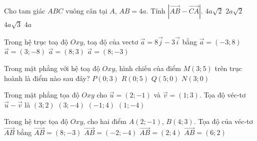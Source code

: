 \begin{ex}%
	Cho tam giác $ABC$ vuông cân tại $A$, $AB=4a$. Tính $|\overrightarrow{AB}-\overrightarrow{CA}|$.
	\choice
	{\True $ 4a\sqrt{2}$}
	{$2a\sqrt{2} $}
	{$ 4a\sqrt{3}$}
	{$ 4a$}
\end{ex}

\begin{ex}%
	Trong hệ trục toạ độ $Oxy$, toạ độ của vectơ $\overrightarrow{a}=8\overrightarrow{j}-3\overrightarrow{i}$ bằng
	\choice 
	{\True $\overrightarrow{a}=\left( -3;8 \right)$}
	{$\overrightarrow{a}=\left( 3;-8 \right)$}
	{$\overrightarrow{a}=\left( 8;3 \right)$}
	{$\overrightarrow{a}=\left( 8;-3 \right)$}
\end{ex}

\begin{ex}%
	Trong mặt phẳng với hệ toạ độ $Oxy$, hình chiếu của điểm $M(3;5)$ trên trục 
	hoành là điểm nào sau đây?
	\choice
	{$P(0;3)$}
	{$R(0;5)$}
	{$Q(5;0)$}
	{\True $N(3;0)$}
\end{ex}

\begin{ex}%
	Trong mặt phẳng tọa độ $Oxy$ cho $\overrightarrow{u}=\left(2;-1\right)$ và $\overrightarrow v=\left(1;3\right)$. Tọa độ véc-tơ $\overrightarrow{u}-\overrightarrow{v}$ là
	\choice
	{$\left(3;2\right)$}
	{$\left(3;-4\right)$}
	{$\left(-1;4\right)$}
	{\True $\left(1;-4\right)$}
\end{ex}

\begin{ex}%
	Trong hệ trục tọa độ $Oxy$, cho hai điểm $A\left( 2;-1 \right)$, $B\left( 4;3 \right)$. Tọa độ của véc-tơ $\overrightarrow{AB}$ bằng
	\choice 
	{$\overrightarrow{AB}=\left( 8;-3 \right)$}
	{$\overrightarrow{AB}=\left( -2;-4 \right)$}
	{\True $\overrightarrow{AB}=\left( 2;4 \right)$}
	{$\overrightarrow{AB}=\left( 6;2 \right)$}
\end{ex}


